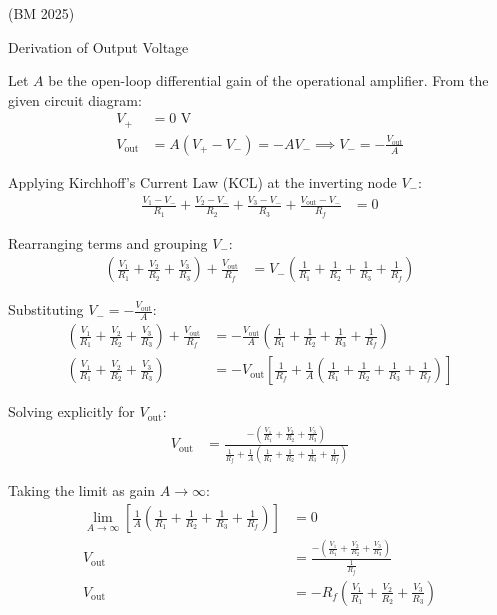 \begin{enumerate}[label=\thesubsection.\arabic*, ref=\thesubsection.\theenumi]
\hfill  (BM 2025)


\solution

Derivation of Output Voltage




Let $A$ be the open-loop differential gain of the operational amplifier. 
From the given circuit diagram:
\begin{align}
V_+ &= 0 \text{ V} \\
V_{\text{out}} &= A(V_+ - V_-) = -A V_- \implies V_- = -\frac{V_{\text{out}}}{A}
\end{align}

Applying Kirchhoff's Current Law (KCL) at the inverting node $V_-$:
\begin{align}
\frac{V_1 - V_-}{R_1} + \frac{V_2 - V_-}{R_2} + \frac{V_3 - V_-}{R_3} + \frac{V_{\text{out}} - V_-}{R_f} &= 0
\end{align}

Rearranging terms and grouping $V_-$:
\begin{align}
\left( \frac{V_1}{R_1} + \frac{V_2}{R_2} + \frac{V_3}{R_3} \right) + \frac{V_{\text{out}}}{R_f} &= V_- \left( \frac{1}{R_1} + \frac{1}{R_2} + \frac{1}{R_3} + \frac{1}{R_f} \right)
\end{align}

Substituting $V_- = -\frac{V_{\text{out}}}{A}$:
\begin{align}
\left( \frac{V_1}{R_1} + \frac{V_2}{R_2} + \frac{V_3}{R_3} \right) + \frac{V_{\text{out}}}{R_f} &= -\frac{V_{\text{out}}}{A} \left( \frac{1}{R_1} + \frac{1}{R_2} + \frac{1}{R_3} + \frac{1}{R_f} \right) \\
\left( \frac{V_1}{R_1} + \frac{V_2}{R_2} + \frac{V_3}{R_3} \right) &= -V_{\text{out}} \left[ \frac{1}{R_f} + \frac{1}{A} \left( \frac{1}{R_1} + \frac{1}{R_2} + \frac{1}{R_3} + \frac{1}{R_f} \right) \right]
\end{align}

Solving explicitly for $V_{\text{out}}$:
\begin{align}
V_{\text{out}} &= \frac{-\left( \frac{V_1}{R_1} + \frac{V_2}{R_2} + \frac{V_3}{R_3} \right)}{\frac{1}{R_f} + \frac{1}{A} \left( \frac{1}{R_1} + \frac{1}{R_2} + \frac{1}{R_3} + \frac{1}{R_f} \right)}
\end{align}


Taking the limit as gain $A \to \infty$:
\begin{align}
\lim_{A \to \infty} \left[ \frac{1}{A} \left( \frac{1}{R_1} + \frac{1}{R_2} + \frac{1}{R_3} + \frac{1}{R_f} \right) \right] &= 0 \\
V_{\text{out}} &= \frac{-\left( \frac{V_1}{R_1} + \frac{V_2}{R_2} + \frac{V_3}{R_3} \right)}{\frac{1}{R_f}} \\
V_{\text{out}} &= -R_f \left( \frac{V_1}{R_1} + \frac{V_2}{R_2} + \frac{V_3}{R_3} \right)
\end{align}



\end{enumerate}
